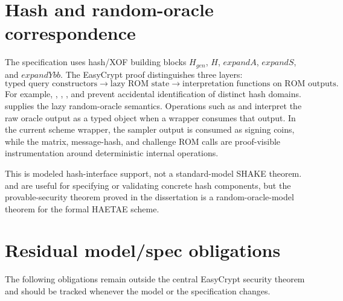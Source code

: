\section{Hash and random-oracle correspondence}
\label{sec:model-spec-hash-correspondence}

The specification uses hash/XOF building blocks \(H_{gen}\), \(H\),
\(expandA\), \(expandS\), and \(expandYbb\).  The EasyCrypt proof distinguishes
three layers:
\[
  \text{typed query constructors}
  \longrightarrow
  \text{lazy ROM state}
  \longrightarrow
  \text{interpretation functions on ROM outputs}.
\]
For example, , ,
, and  prevent accidental
identification of distinct hash domains.   supplies the
lazy random-oracle semantics.  Operations such as  and
 interpret the raw oracle output as a typed object when a
wrapper consumes that output.  In the current scheme wrapper, the sampler output
is consumed as signing coins, while the matrix, message-hash, and challenge ROM
calls are proof-visible instrumentation around deterministic internal
operations.

This is modeled hash-interface support, not a standard-model SHAKE theorem.
 and  are useful for specifying
or validating concrete hash components, but the provable-security theorem proved
in the dissertation is a random-oracle-model theorem for the formal HAETAE
scheme.

\section{Residual model/spec obligations}
\label{sec:model-spec-residual-obligations}

The following obligations remain outside the central EasyCrypt security theorem
and should be tracked whenever the model or the specification changes.

